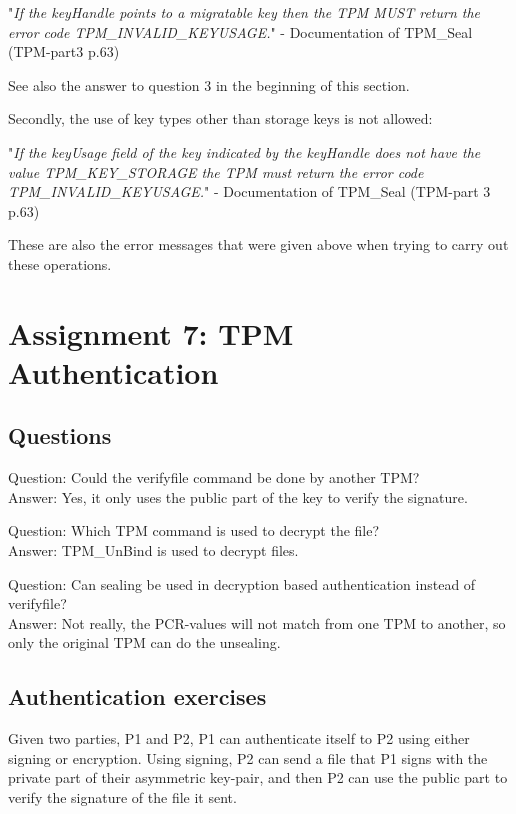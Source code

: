 \documentclass[10pt]{article}
\begin{document}
"\textit{If the keyHandle points to a migratable key then the TPM MUST
return the error code TPM\_INVALID\_KEYUSAGE.}"
- Documentation of TPM\_Seal (TPM-part3 p.63)

See also the answer to question 3 in the beginning of this section.

Secondly, the use of key types other than storage keys is not allowed: 

"\textit{If the keyUsage field of the key indicated by the keyHandle does not
have the value TPM\_KEY\_STORAGE the TPM must return the error
code \\TPM\_INVALID\_KEYUSAGE.}" - Documentation of TPM\_Seal (TPM-part 3 p.63)

These are also the error messages that were given above when trying
to carry out these operations.

\section{Assignment 7: TPM Authentication}

  \subsection{Questions}

    Question: Could the verifyfile command be done by another TPM? \\
    Answer: Yes, it only uses the public part of the key to verify the signature.

    Question: Which TPM command is used to decrypt the file? \\
    Answer: TPM\_UnBind is used to decrypt files.

    Question: Can sealing be used in decryption based authentication instead of
    verifyfile? \\
    Answer: Not really, the PCR-values will not match from one TPM to another, so only
    the original TPM can do the unsealing.

  \subsection{Authentication exercises}

    Given two parties, P1 and P2, P1 can authenticate itself to P2 using either
    signing or encryption. Using signing, P2 can send a file that P1 signs with
    the private part of their asymmetric key-pair, and then P2 can use the
    public part to verify the signature of the file it sent.
\end{document}
